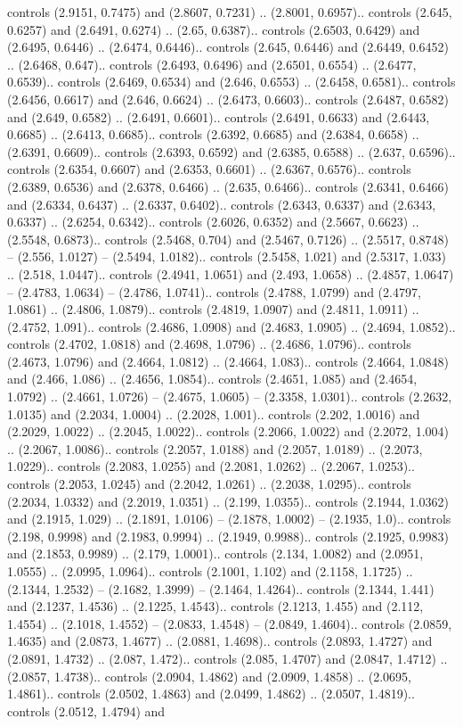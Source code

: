 controls (2.9151, 0.7475) and (2.8607, 0.7231) .. (2.8001, 0.6957).. controls (2.645, 0.6257) and (2.6491, 0.6274) .. (2.65, 0.6387).. controls (2.6503, 0.6429) and (2.6495, 0.6446) .. (2.6474, 0.6446).. controls (2.645, 0.6446) and (2.6449, 0.6452) .. (2.6468, 0.647).. controls (2.6493, 0.6496) and (2.6501, 0.6554) .. (2.6477, 0.6539).. controls (2.6469, 0.6534) and (2.646, 0.6553) .. (2.6458, 0.6581).. controls (2.6456, 0.6617) and (2.646, 0.6624) .. (2.6473, 0.6603).. controls (2.6487, 0.6582) and (2.649, 0.6582) .. (2.6491, 0.6601).. controls (2.6491, 0.6633) and (2.6443, 0.6685) .. (2.6413, 0.6685).. controls (2.6392, 0.6685) and (2.6384, 0.6658) .. (2.6391, 0.6609).. controls (2.6393, 0.6592) and (2.6385, 0.6588) .. (2.637, 0.6596).. controls (2.6354, 0.6607) and (2.6353, 0.6601) .. (2.6367, 0.6576).. controls (2.6389, 0.6536) and (2.6378, 0.6466) .. (2.635, 0.6466).. controls (2.6341, 0.6466) and (2.6334, 0.6437) .. (2.6337, 0.6402).. controls (2.6343, 0.6337) and (2.6343, 0.6337) .. (2.6254, 0.6342).. controls (2.6026, 0.6352) and (2.5667, 0.6623) .. (2.5548, 0.6873).. controls (2.5468, 0.704) and (2.5467, 0.7126) .. (2.5517, 0.8748) -- (2.556, 1.0127) -- (2.5494, 1.0182).. controls (2.5458, 1.021) and (2.5317, 1.033) .. (2.518, 1.0447).. controls (2.4941, 1.0651) and (2.493, 1.0658) .. (2.4857, 1.0647) -- (2.4783, 1.0634) -- (2.4786, 1.0741).. controls (2.4788, 1.0799) and (2.4797, 1.0861) .. (2.4806, 1.0879).. controls (2.4819, 1.0907) and (2.4811, 1.0911) .. (2.4752, 1.091).. controls (2.4686, 1.0908) and (2.4683, 1.0905) .. (2.4694, 1.0852).. controls (2.4702, 1.0818) and (2.4698, 1.0796) .. (2.4686, 1.0796).. controls (2.4673, 1.0796) and (2.4664, 1.0812) .. (2.4664, 1.083).. controls (2.4664, 1.0848) and (2.466, 1.086) .. (2.4656, 1.0854).. controls (2.4651, 1.085) and (2.4654, 1.0792) .. (2.4661, 1.0726) -- (2.4675, 1.0605) -- (2.3358, 1.0301).. controls (2.2632, 1.0135) and (2.2034, 1.0004) .. (2.2028, 1.001).. controls (2.202, 1.0016) and (2.2029, 1.0022) .. (2.2045, 1.0022).. controls (2.2066, 1.0022) and (2.2072, 1.004) .. (2.2067, 1.0086).. controls (2.2057, 1.0188) and (2.2057, 1.0189) .. (2.2073, 1.0229).. controls (2.2083, 1.0255) and (2.2081, 1.0262) .. (2.2067, 1.0253).. controls (2.2053, 1.0245) and (2.2042, 1.0261) .. (2.2038, 1.0295).. controls (2.2034, 1.0332) and (2.2019, 1.0351) .. (2.199, 1.0355).. controls (2.1944, 1.0362) and (2.1915, 1.029) .. (2.1891, 1.0106) -- (2.1878, 1.0002) -- (2.1935, 1.0).. controls (2.198, 0.9998) and (2.1983, 0.9994) .. (2.1949, 0.9988).. controls (2.1925, 0.9983) and (2.1853, 0.9989) .. (2.179, 1.0001).. controls (2.134, 1.0082) and (2.0951, 1.0555) .. (2.0995, 1.0964).. controls (2.1001, 1.102) and (2.1158, 1.1725) .. (2.1344, 1.2532) -- (2.1682, 1.3999) -- (2.1464, 1.4264).. controls (2.1344, 1.441) and (2.1237, 1.4536) .. (2.1225, 1.4543).. controls (2.1213, 1.455) and (2.112, 1.4554) .. (2.1018, 1.4552) -- (2.0833, 1.4548) -- (2.0849, 1.4604).. controls (2.0859, 1.4635) and (2.0873, 1.4677) .. (2.0881, 1.4698).. controls (2.0893, 1.4727) and (2.0891, 1.4732) .. (2.087, 1.472).. controls (2.085, 1.4707) and (2.0847, 1.4712) .. (2.0857, 1.4738).. controls (2.0904, 1.4862) and (2.0909, 1.4858) .. (2.0695, 1.4861).. controls (2.0502, 1.4863) and (2.0499, 1.4862) .. (2.0507, 1.4819).. controls (2.0512, 1.4794) and 